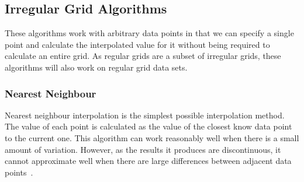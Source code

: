 
    \subsection{Irregular Grid Algorithms}\label{background_interpolation_methods_irregular_grid}

        These algorithms work with arbitrary data points in that we can specify a single point and calculate the interpolated value for it without being required to calculate an entire grid. As regular grids are a subset of irregular grids, these algorithms will also work on regular grid data sets.

        \subsubsection{Nearest Neighbour}\label{background_interpolation_methods_nearest_neighbour}

            Nearest neighbour interpolation is the simplest possible interpolation method. The value of each point is calculated as the value of the closest know data point to the current one. This algorithm can work reasonably well when there is a small amount of variation. However, as the results it produces are discontinuous, it cannot approximate well when there are large differences between adjacent data points~\cite{imageresamplingcomparison}.

